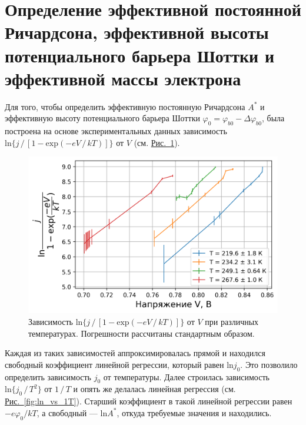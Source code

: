 \documentclass[12pt]{article}
\newcommand*{\figref}[2][]{\hyperref[#2]{Рис.~\ref*{#2}#1}}
\begin{document}
	\section{Определение эффективной постоянной Ричардсона, эффективной высоты потенциального барьера Шоттки и эффективной массы электрона}

	Для того, чтобы определить эффективную постоянную Ричардсона $A^*$ и эффективную высоту потенциального барьера Шоттки $\varphi_0 = \varphi_{b0} - \Delta \varphi_{b0}$, была построена на основе экспериментальных данных зависимость $\mathrm{ln}\{ j\,/\, [1 - \mathrm{exp}(-eV\,/\,kT)] \}$ от $V$ (см. \figref{fig:bigeq_vs_v}).

	\begin{figure}[htbp]
		\centering
		\includegraphics[width=\textwidth]{../figures/bigeq_vs_v.png}
		\caption{Зависимость $\mathrm{ln}\{ j\,/\, [1 - \mathrm{exp}(-eV\,/\,kT)] \}$ от $V$ при различных температурах. Погрешности рассчитаны стандартным образом.}
		\label{fig:bigeq_vs_v}
	\end{figure}

	Каждая из таких зависимостей аппроксимировалась прямой и находился свободный коэффициент линейной регрессии, который равен $\mathrm{ln}j_0$. Это позволило определить зависимость $j_0$ от температуры. Далее строилась зависимость $\mathrm{ln}\{j_0\, /\, T^2\}$ от $1\,/\,T$  и опять же делалась линейная регрессия (см. \figref{fig:ln_vs_1T}). Старший коэффициент в такой линейной регрессии равен $-e\varphi_0/kT$, а свободный --- $\mathrm{ln}A^*$, откуда требуемые значения и находились.
\end{document}
